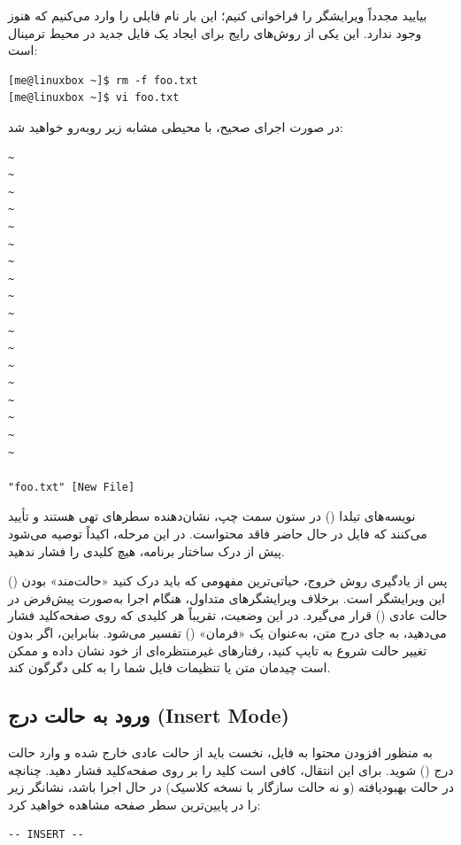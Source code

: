 بیایید مجدداً ویرایشگر  را فراخوانی کنیم؛ این بار نام فایلی را وارد می‌کنیم که هنوز وجود ندارد. این یکی از روش‌های رایج برای ایجاد یک فایل جدید در محیط ترمینال است:

\begin{latin}
\begin{lstlisting}
[me@linuxbox ~]$ rm -f foo.txt
[me@linuxbox ~]$ vi foo.txt
\end{lstlisting}
\end{latin}

در صورت اجرای صحیح، با محیطی مشابه زیر روبه‌رو خواهید شد:

\begin{latin}
\begin{lstlisting}
~
~
~
~
~
~
~
~
~
~
~
~
~
~
~
~
~
~

"foo.txt" [New File]
\end{lstlisting}
\end{latin}

نویسه‌های تیلدا (\cmd{\textasciitilde}) در ستون سمت چپ، نشان‌دهنده سطرهای تهی هستند و تأیید می‌کنند که فایل در حال حاضر فاقد محتواست. در این مرحله، اکیداً توصیه می‌شود پیش از درک ساختار برنامه، هیچ کلیدی را فشار ندهید.

پس از یادگیری روش خروج، حیاتی‌ترین مفهومی که باید درک کنید «حالت‌مند» بودن () این ویرایشگر است. برخلاف ویرایشگرهای متداول،  هنگام اجرا به‌صورت پیش‌فرض در حالت عادی () قرار می‌گیرد. در این وضعیت، تقریباً هر کلیدی که روی صفحه‌کلید فشار می‌دهید، به جای درج متن، به‌عنوان یک «فرمان» () تفسیر می‌شود. بنابراین، اگر بدون تغییر حالت شروع به تایپ کنید،  رفتارهای غیرمنتظره‌ای از خود نشان داده و ممکن است چیدمان متن یا تنظیمات فایل شما را به کلی دگرگون کند.

\subsection{ورود به حالت درج (Insert Mode)}

به منظور افزودن محتوا به فایل، نخست باید از حالت عادی خارج شده و وارد حالت درج () شوید. برای این انتقال، کافی است کلید  را بر روی صفحه‌کلید فشار دهید. چنانچه  در حالت بهبودیافته (و نه حالت سازگار با نسخه کلاسیک) در حال اجرا باشد، نشانگر زیر را در پایین‌ترین سطر صفحه مشاهده خواهید کرد:

\begin{latin}
\begin{lstlisting}
-- INSERT --
\end{lstlisting}
\end{latin}

